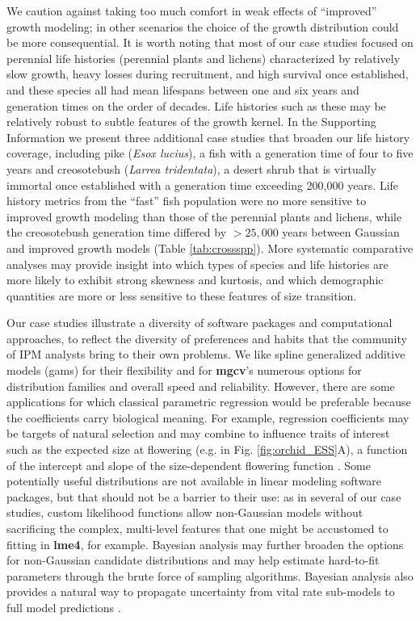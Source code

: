 \documentclass[12pt]{article}
\begin{document}
\begin{spacing}{1.9}
We caution against taking too much comfort in weak effects of ``improved'' growth modeling; in other scenarios the choice of the growth distribution could be more consequential. 
It is worth noting that most of our case studies focused on perennial life histories (perennial plants and lichens) characterized by relatively slow growth, heavy losses during recruitment, and high survival once established, and these species all had mean lifespans between one and six years and generation times on the order of decades. 
Life histories such as these may be relatively robust to subtle features of the growth kernel. 
In the Supporting Information we present three additional case studies that broaden our life history coverage, including pike (\emph{Esox lucius}), a fish with a generation time of four to five years and creosotebush (\emph{Larrea tridentata}), a desert shrub that is virtually immortal once established with a generation time exceeding 200,000 years. 
Life history metrics from the ``fast'' fish population were no more sensitive to improved growth modeling than those of the perennial plants and lichens, while the creosotebush generation time differed by $>25,000$ years between Gaussian and improved growth models (Table \ref{tab:crossspp}). 
More systematic comparative analyses may provide insight into which types of species and life histories are more likely to exhibit strong skewness and kurtosis, and which demographic quantities are more or less sensitive to these features of size transition. 

Our case studies illustrate a diversity of software packages and computational approaches, to reflect the diversity of preferences and habits that the community of IPM analysts bring to their own problems. 
We like spline generalized additive models (gams) for their flexibility and for \textbf{mgcv}'s numerous options for distribution families and overall speed and reliability. 
However, there are some applications for which classical parametric regression would be preferable because the coefficients carry biological meaning.
For example, regression coefficients may be targets of natural selection \citep{rees2016evolving} and may combine to influence traits of interest such as the expected size at flowering (e.g. in Fig. \ref{fig:orchid_ESS}A), a function of the intercept and slope of the size-dependent flowering function \citep{metcalf2003evolutionary}. 
Some potentially useful distributions are not available in linear modeling software packages, but that should not be a barrier to their use: as in several of our case studies, custom likelihood functions allow non-Gaussian models without sacrificing the complex, multi-level features that one might be accustomed to fitting in \textbf{lme4}, for example. 
Bayesian analysis may further broaden the options for non-Gaussian candidate distributions and may help estimate hard-to-fit parameters through the brute force of sampling algorithms. 
Bayesian analysis also provides a natural way to propagate uncertainty from vital rate sub-models to full model predictions \citep{elderd2016quantifying}. 


\end{spacing}
\end{document}
